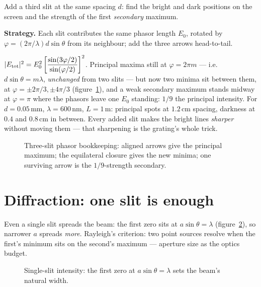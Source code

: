 \begin{example}\label{ex:3slit}
Add a third slit at the same spacing $d$: find the bright and dark
positions on the screen and the strength of the first
\emph{secondary} maximum.
\par\smallskip
\textbf{Strategy.} Each slit contributes the same phasor length
$E_0$, rotated by $\varphi=(2\pi/\lambda)d\sin\theta$ from its
neighbour; add the three arrows head-to-tail.
\begin{solution}
$|E_{\rm tot}|^{2}=E_0^{2}\left[\dfrac{\sin(3\varphi/2)}{\sin(\varphi/2)}\right]^{2}$.
Principal maxima still at $\varphi=2\pi m$ --- i.e.\ $d\sin\theta=m\lambda$,
\emph{unchanged} from two slits --- but now two minima sit between
them, at $\varphi=\pm2\pi/3,\pm4\pi/3$
(figure~\ref{fig:phasor3}), and a weak secondary maximum stands
midway at $\varphi=\pi$ where the phasors leave one $E_0$ standing:
$1/9$ the principal intensity. For $d=0.05$\,mm, $\lambda=600$\,nm,
$L=1$\,m: principal spots at $1.2$\,cm spacing, darkness at
$0.4$ and $0.8$\,cm in between. Every added slit makes the bright
lines \emph{sharper} without moving them --- that sharpening is the
grating's whole trick. \checkmark
\end{solution}
\end{example}

\begin{figure}[htbp]\centering

\caption{Three-slit phasor bookkeeping: aligned arrows give the
principal maximum; the equilateral closure gives the new minima; one
surviving arrow is the $1/9$-strength secondary.}
\label{fig:phasor3}
\end{figure}

\section{Diffraction: one slit is enough}\label{sec:wav-diffr}

Even a single slit spreads the beam: the first zero sits at
$a\sin\theta=\lambda$ (figure~\ref{fig:1slit}), so narrower $a$ spreads
\emph{more}. Rayleigh's criterion: two point sources resolve when the
first's minimum sits on the second's maximum --- aperture size as the
optics budget.

\begin{figure}[htbp]\centering

\caption{Single-slit intensity: the first zero at
$a\sin\theta=\lambda$ sets the beam's natural width.}
\label{fig:1slit}
\end{figure}

